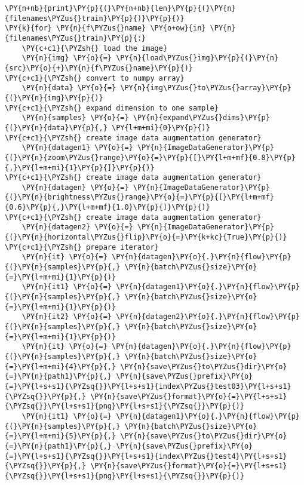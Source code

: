 \begin{tcolorbox}[breakable, size=fbox, boxrule=1pt, pad at break*=1mm,colback=cellbackground, colframe=cellborder]
\begin{Verbatim}[commandchars=\\\{\}]
\PY{n+nb}{print}\PY{p}{(}\PY{n+nb}{len}\PY{p}{(}\PY{n}{filenames\PYZus{}train}\PY{p}{)}\PY{p}{)}
\PY{k}{for} \PY{n}{f\PYZus{}name} \PY{o+ow}{in} \PY{n}{filenames\PYZus{}train}\PY{p}{:}
    \PY{c+c1}{\PYZsh{} load the image}
    \PY{n}{img} \PY{o}{=} \PY{n}{load\PYZus{}img}\PY{p}{(}\PY{n}{src}\PY{o}{+}\PY{n}{f\PYZus{}name}\PY{p}{)}
\PY{c+c1}{\PYZsh{} convert to numpy array}
    \PY{n}{data} \PY{o}{=} \PY{n}{img\PYZus{}to\PYZus{}array}\PY{p}{(}\PY{n}{img}\PY{p}{)}
\PY{c+c1}{\PYZsh{} expand dimension to one sample}
    \PY{n}{samples} \PY{o}{=} \PY{n}{expand\PYZus{}dims}\PY{p}{(}\PY{n}{data}\PY{p}{,} \PY{l+m+mi}{0}\PY{p}{)}
\PY{c+c1}{\PYZsh{} create image data augmentation generator}
    \PY{n}{datagen1} \PY{o}{=} \PY{n}{ImageDataGenerator}\PY{p}{(}\PY{n}{zoom\PYZus{}range}\PY{o}{=}\PY{p}{[}\PY{l+m+mf}{0.8}\PY{p}{,}\PY{l+m+mi}{1}\PY{p}{]}\PY{p}{)}
\PY{c+c1}{\PYZsh{} create image data augmentation generator}
    \PY{n}{datagen} \PY{o}{=} \PY{n}{ImageDataGenerator}\PY{p}{(}\PY{n}{brightness\PYZus{}range}\PY{o}{=}\PY{p}{[}\PY{l+m+mf}{0.6}\PY{p}{,}\PY{l+m+mf}{1.0}\PY{p}{]}\PY{p}{)}
\PY{c+c1}{\PYZsh{} create image data augmentation generator}
    \PY{n}{datagen2} \PY{o}{=} \PY{n}{ImageDataGenerator}\PY{p}{(}\PY{n}{horizontal\PYZus{}flip}\PY{o}{=}\PY{k+kc}{True}\PY{p}{)}
\PY{c+c1}{\PYZsh{} prepare iterator}
    \PY{n}{it} \PY{o}{=} \PY{n}{datagen}\PY{o}{.}\PY{n}{flow}\PY{p}{(}\PY{n}{samples}\PY{p}{,} \PY{n}{batch\PYZus{}size}\PY{o}{=}\PY{l+m+mi}{1}\PY{p}{)}
    \PY{n}{it1} \PY{o}{=} \PY{n}{datagen1}\PY{o}{.}\PY{n}{flow}\PY{p}{(}\PY{n}{samples}\PY{p}{,} \PY{n}{batch\PYZus{}size}\PY{o}{=}\PY{l+m+mi}{1}\PY{p}{)}
    \PY{n}{it2} \PY{o}{=} \PY{n}{datagen2}\PY{o}{.}\PY{n}{flow}\PY{p}{(}\PY{n}{samples}\PY{p}{,} \PY{n}{batch\PYZus{}size}\PY{o}{=}\PY{l+m+mi}{1}\PY{p}{)}
    \PY{n}{it} \PY{o}{=} \PY{n}{datagen}\PY{o}{.}\PY{n}{flow}\PY{p}{(}\PY{n}{samples}\PY{p}{,} \PY{n}{batch\PYZus{}size}\PY{o}{=}\PY{l+m+mi}{4}\PY{p}{,} \PY{n}{save\PYZus{}to\PYZus{}dir}\PY{o}{=}\PY{n}{path1}\PY{p}{,} \PY{n}{save\PYZus{}prefix}\PY{o}{=}\PY{l+s+s1}{\PYZsq{}}\PY{l+s+s1}{index\PYZus{}test03}\PY{l+s+s1}{\PYZsq{}}\PY{p}{,} \PY{n}{save\PYZus{}format}\PY{o}{=}\PY{l+s+s1}{\PYZsq{}}\PY{l+s+s1}{png}\PY{l+s+s1}{\PYZsq{}}\PY{p}{)}
    \PY{n}{it1} \PY{o}{=} \PY{n}{datagen1}\PY{o}{.}\PY{n}{flow}\PY{p}{(}\PY{n}{samples}\PY{p}{,} \PY{n}{batch\PYZus{}size}\PY{o}{=}\PY{l+m+mi}{5}\PY{p}{,} \PY{n}{save\PYZus{}to\PYZus{}dir}\PY{o}{=}\PY{n}{path1}\PY{p}{,} \PY{n}{save\PYZus{}prefix}\PY{o}{=}\PY{l+s+s1}{\PYZsq{}}\PY{l+s+s1}{index\PYZus{}test4}\PY{l+s+s1}{\PYZsq{}}\PY{p}{,} \PY{n}{save\PYZus{}format}\PY{o}{=}\PY{l+s+s1}{\PYZsq{}}\PY{l+s+s1}{png}\PY{l+s+s1}{\PYZsq{}}\PY{p}{)}

\end{Verbatim}
\end{tcolorbox}
